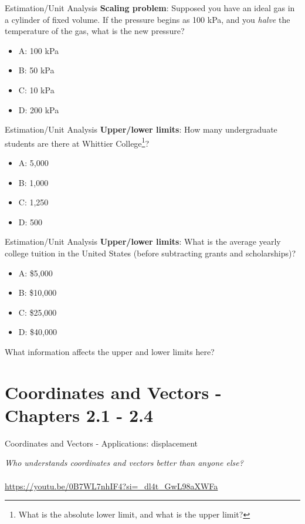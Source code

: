 \documentclass{beamer}
\begin{document}
\begin{frame}{Estimation/Unit Analysis}
\textbf{Scaling problem}: Supposed you have an ideal gas in a cylinder of fixed volume.  If the pressure begins as 100 kPa, and you \textit{halve} the temperature of the gas, what is the new pressure?
\begin{itemize}
\item A: 100 kPa
\item B: 50 kPa
\item C: 10 kPa
\item D: 200 kPa
\end{itemize}
\end{frame}

\begin{frame}{Estimation/Unit Analysis}
\textbf{Upper/lower limits}: How many undergraduate students are there at Whittier College\footnote{What is the absolute lower limit, and what is the upper limit?}?
\begin{itemize}
\item A: 5,000
\item B: 1,000
\item C: 1,250
\item D: 500
\end{itemize}
\end{frame}

\begin{frame}{Estimation/Unit Analysis}
\textbf{Upper/lower limits}: What is the average yearly college tuition in the United States (before subtracting grants and scholarships)?
\begin{itemize}
\item A: \$5,000
\item B: \$10,000
\item C: \$25,000
\item D: \$40,000
\end{itemize}
What information affects the \alert{upper} and \alert{lower} limits here?
\end{frame}

\section{Coordinates and Vectors - Chapters 2.1 - 2.4}

\begin{frame}{Coordinates and Vectors - Applications: displacement}
\begin{tcolorbox}[colback=white,colframe=gray,title=Activity Link]
\textit{Who understands coordinates and vectors better than anyone else?} \\ \\
\url{https://youtu.be/0B7WL7nhIF4?si=_dl4t_GwL98aXWFa}
\end{tcolorbox}
\end{frame}
\end{document}
